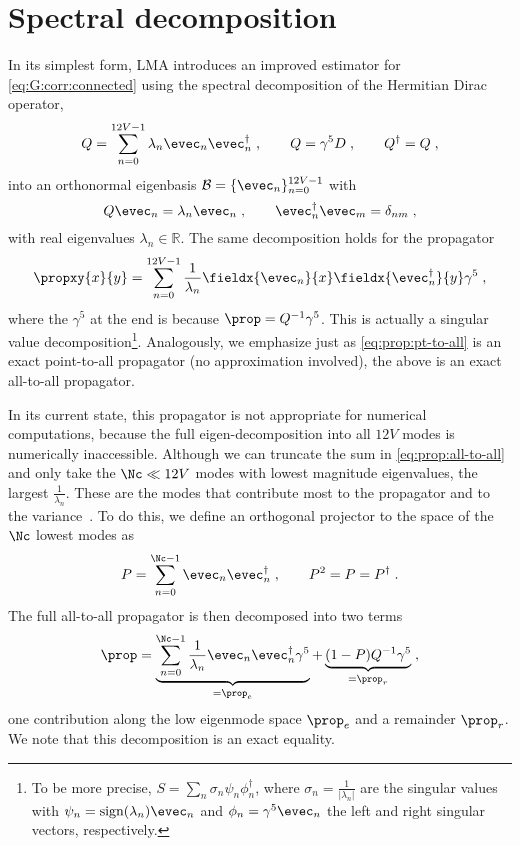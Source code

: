 \section{Spectral decomposition}
\label{sec:lma:prop:decomp}

In its simplest form, LMA introduces an improved estimator for \cref{eq:G:corr:connected} using the spectral decomposition of the Hermitian Dirac operator,
\begin{equation}
Q = \sum_{n=0}^{12V-1} \lambda_{n} \evec_{n} \evec_{n}^{\dagger} \;,
\qquad
Q = \gamma^{5} D \;,
\qquad
Q^{\dagger} = Q \;,
\end{equation}
into an orthonormal eigenbasis $\mathcal{B} = \{ \evec_n \}_{n=0}^{12V-1}$ with
\begin{equation}
Q \evec_{n} = \lambda_{n} \evec_{n} \;,
\qquad
\evec_{n}^{\dagger} \evec_{m} = \delta_{nm} \;,
\end{equation}
with real eigenvalues $\lambda_{n} \in \mathbb{R}$.
The same decomposition holds for the propagator
\begin{equation} \label{eq:prop:all-to-all}
\propxy{x}{y} = \sum_{n=0}^{12V-1} \frac{1}{\lambda_{n}} \fieldx{\evec_{n}}{x} \fieldx{\evec_{n}^{\dagger}}{y} \gamma^{5} \;,
\end{equation}
where the $\gamma^{5}$ at the end is because $\prop = Q^{-1} \gamma^{5}$.
This is actually a singular value decomposition\footnote{To be more precise, $S = \sum_n \sigma_n \psi_{n} \phi_{n}^{\dagger}$, where $\sigma_n = \frac{1}{\lvert \lambda_{n} \rvert}$ are the singular values with $\psi_{n} = \text{sign}(\lambda_n) \evec_{n}$ and $\phi_{n} = \gamma^{5} \evec_{n}$ the left and right singular vectors, respectively.}.
Analogously, we emphasize just as \cref{eq:prop:pt-to-all} is an exact point-to-all propagator (no approximation involved), the above is an exact all-to-all propagator.

In its current state, this propagator is not appropriate for numerical computations, because the full eigen-decomposition into all $12V$ modes is numerically inaccessible.
Although we can truncate the sum in \cref{eq:prop:all-to-all} and only take the $\Nc \ll 12 V$ modes with lowest magnitude eigenvalues, \ie the largest $\frac{1}{\lambda_{n}}$.
These are the modes that contribute most to the propagator and to the variance~\cite{DeGrand_2004}.
To do this, we define an orthogonal projector to the space of the $\Nc$ lowest modes as
\begin{equation} \label{eq:lma:projector}
P = \sum_{n=0}^{\Nc-1} \evec_n \evec_n^{\dagger} \;,
\qquad
P^{2} = P = P^{\dagger} \;.
\end{equation}
The full all-to-all propagator is then decomposed into two terms
\begin{equation} \label{eq:prop:lma}
\prop
= \underbrace{\sum_{n=0}^{\Nc-1}
  \frac{1}{\lambda_{n}} \evec_{n} \evec_{n}^{\dagger} \gamma^{5}}_{=\prop_e}
+ \underbrace{(1-P) Q^{-1} \gamma^{5}}_{=\prop_r} \;,
\end{equation}
one contribution along the low eigenmode space $\prop_e$ and a remainder $\prop_r$.
We note that this decomposition is an exact equality.

